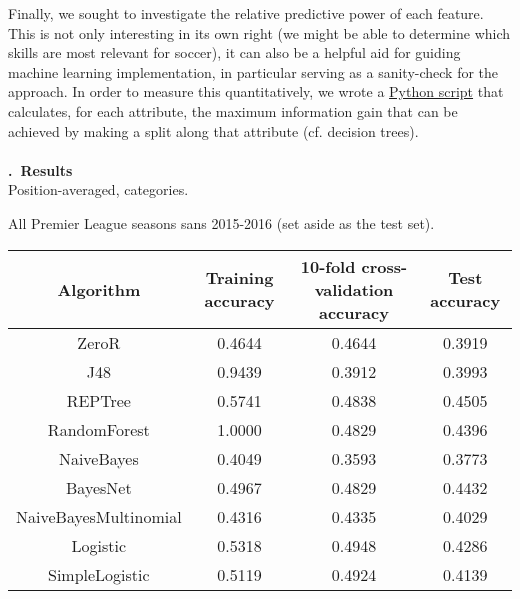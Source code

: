 \documentclass[a4paper,11pt,table]{article}
\renewcommand{\section}[1]{\stepcounter{section}\noindent\textbf{\arabic{section}.~#1}\\}
\begin{document}
Finally, we sought to investigate the relative predictive power of each feature. This is not only interesting in its own right (we might be able to determine which skills are most relevant for soccer), it can also be a helpful aid for guiding machine learning implementation, in particular serving as a sanity-check for the approach. In order to measure this quantitatively, we wrote a \href{https://github.com/TheLordBlarg/Soccer_Success/blob/master/codes/feature_analysis/info_entropy.py}{Python script} that calculates, for each attribute, the maximum information gain that can be achieved by making a split along that attribute (cf. decision trees). \\
~\\
\section{Results}

Position-averaged, categories.

All Premier League seasons sans 2015-2016 (set aside as the test set).

\begin{center}
    \begin{tabular}{|c|c|c|c|}
        \hline
        Algorithm               &   Training accuracy  &   10-fold cross-validation accuracy  &   Test accuracy \\
        \hline
        ZeroR                   &   0.4644          &   0.4644      &   0.3919 \\
        \hline
        J48                     &   0.9439          &   0.3912      &   0.3993 \\
        \hline
        REPTree                 &   0.5741          &   0.4838      &   \cellcolor{red!25}0.4505 \\
        \hline
        RandomForest            &   \cellcolor{red!25}1.0000          &   0.4829      &   0.4396 \\
        \hline
        NaiveBayes              &   0.4049          &   0.3593      &   0.3773 \\
        \hline
        BayesNet                &   0.4967          &   0.4829      &   0.4432 \\
        \hline
        NaiveBayesMultinomial   &   0.4316          &   0.4335      &   0.4029 \\
        \hline
        Logistic                &   0.5318          &   \cellcolor{red!25}0.4948      &   0.4286 \\
        \hline
        SimpleLogistic          &   0.5119          &   0.4924      &   0.4139 \\
        \hline
    \end{tabular}
\end{center}
\end{document}
